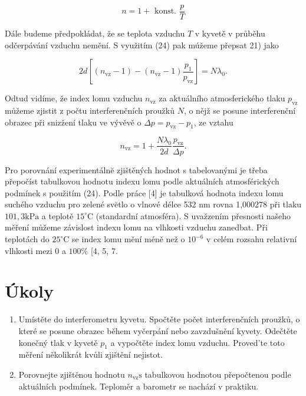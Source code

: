 \documentclass[czech,11pt,a4paper]{article}
\begin{document}
\begin{multicols}{2}
	\begin{equation}
		n=1+\text { konst. } \frac{p}{T}
	\end{equation}
	
	
	Dále budeme předpokládat, že se teplota vzduchu $T$ v kyvetě v průběhu odčerpávání vzduchu nemění. S využitím (24) pak múžeme přepsat 21) jako
	
	
	\begin{equation}
		2 d\left[\left(n_{\mathrm{vz}}-1\right)-\left(n_{\mathrm{vz}}-1\right) \frac{p_{1}}{p_{\mathrm{vz}}}\right]=N \lambda_{0} .
	\end{equation}
	
	
	Odtud vidíme, že index lomu vzduchu $n_{\mathrm{vz}}$ za aktuálního atmosferického tlaku $p_{\mathrm{vz}}$ můžeme zjistit z počtu interferenčních proužků $N$, o nějž se posune interferenční obrazec při snizžení tlaku ve vývěvě o $\Delta p=p_{\mathrm{vz}}-p_{1}$, ze vztahu
	
	
	\begin{equation}
		n_{\mathrm{vz}}=1+\frac{N \lambda_{0}}{2 d} \frac{p_{\mathrm{vz}}}{\Delta p} .
	\end{equation}
	
	
	Pro porovnání experimentálnĕ zjištěných hodnot s tabelovanými je třeba přepočíst tabulkovou hodnotu indexu lomu podle aktuálních atmosférických podmínek s použitím (24). Podle práce [4] je tabulková hodnota indexu lomu suchého vzduchu pro zelené svĕtlo o vlnové délce 532 nm rovna 1,000278 při tlaku $101,3 \mathrm{kPa}$ a teplotě $15^{\circ} \mathrm{C}$ (standardní atmosféra). S uvažzením přesnosti našeho měření můžeme závislost indexu lomu na vlhkosti vzduchu zanedbat. Při teplotách do $25^{\circ} \mathrm{C}$ se index lomu mění méně než o $10^{-6}$ v celém rozsahu relativní vlhkosti mezi 0 a $100 \%$ [4, 5, 7.
	
	\section*{Úkoly}
	\begin{enumerate}
		\item Umístěte do interferometru kyvetu. Spočtěte počet interferenčních proužků, o které se posune obrazec během vyčerpání nebo zavzdušnění kyvety. Odečtěte konečný tlak v kyvetě $p_{1}$ a vypočtěte index lomu vzduchu. Proved'te toto měření několikrát kvůli zjištění nejistot.
		\item Porovnejte zjištěnou hodnotu $n_{\mathrm{vz}} \mathrm{s}$ tabulkovou hodnotou přepočtenou podle aktuálních podmínek. Teploměr a barometr se nachází v praktiku.
	\end{enumerate}
	

\end{multicols}
\end{document}
